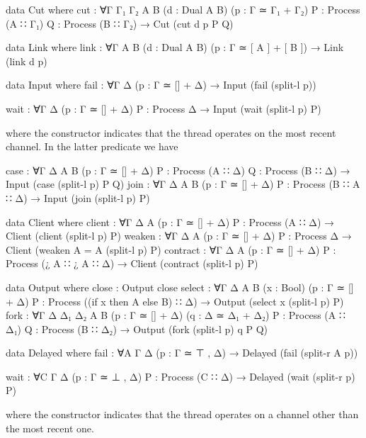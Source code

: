 \begin{AgdaAlign}
\begin{code}[hide]
data Cut where
  cut :
    ∀{Γ Γ₁ Γ₂ A B} (d : Dual A B) (p : Γ ≃ Γ₁ + Γ₂)
    {P : Process (A ∷ Γ₁)} {Q : Process (B ∷ Γ₂)} →
    Cut (cut d p P Q)

data Link where
  link :
    ∀{Γ A B} (d : Dual A B) (p : Γ ≃ [ A ] + [ B ]) → Link (link d p)

data Input where
  fail :
    ∀{Γ Δ}
    (p : Γ ≃ [] + Δ) → Input (fail (split-l p))
\end{code}

\begin{code}
  wait : ∀{Γ Δ} (p : Γ ≃ [] + Δ) {P : Process Δ} → Input (wait (split-l p) P)
\end{code}
where the  constructor indicates that the
thread operates on the most recent channel. In the latter predicate we have

\begin{code}[hide]
  case :
    ∀{Γ Δ A B} (p : Γ ≃ [] + Δ) {P : Process (A ∷ Δ)} {Q : Process (B ∷ Δ)} →
    Input (case (split-l p) P Q)
  join :
    ∀{Γ Δ A B} (p : Γ ≃ [] + Δ) {P : Process (B ∷ A ∷ Δ)} →
    Input (join (split-l p) P)

data Client where
  client :
    ∀{Γ Δ A} (p : Γ ≃ [] + Δ)
    {P : Process (A ∷ Δ)} →
    Client (client (split-l p) P)
  weaken :
    ∀{Γ Δ A} (p : Γ ≃ [] + Δ)
    {P : Process Δ} →
    Client (weaken {A = A} (split-l p) P)
  contract :
    ∀{Γ Δ A} (p : Γ ≃ [] + Δ)
    {P : Process (¿ A ∷ ¿ A ∷ Δ)} →
    Client (contract (split-l p) P)

data Output where
  close : Output close
  select :
    ∀{Γ Δ A B} (x : Bool) (p : Γ ≃ [] + Δ) {P : Process ((if x then A else B) ∷ Δ)} →
    Output (select x (split-l p) P)
  fork :
    ∀{Γ Δ Δ₁ Δ₂ A B} (p : Γ ≃ [] + Δ) (q : Δ ≃ Δ₁ + Δ₂)
    {P : Process (A ∷ Δ₁)} {Q : Process (B ∷ Δ₂)} →
    Output (fork (split-l p) q P Q)

data Delayed where
  fail :
    ∀{A Γ Δ}
    (p : Γ ≃ ⊤ , Δ) → Delayed (fail (split-r {A} p))
\end{code}

\begin{code}
  wait : ∀{C Γ Δ} (p : Γ ≃ ⊥ , Δ) {P : Process (C ∷ Δ)} →
         Delayed (wait (split-r p) P)
\end{code}
where the  constructor indicates that the
thread operates on a channel other than the most recent one.


\end{AgdaAlign}
